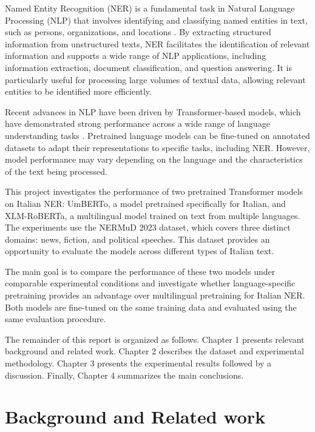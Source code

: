 
Named Entity Recognition (NER) is a fundamental task in Natural Language Processing (NLP) that involves identifying and classifying named entities in text, such as persons, organizations, and locations \cite{mohit2014ner}. By extracting structured information from unstructured texts, NER facilitates the identification of relevant information and supports a wide range of NLP applications, including information extraction, document classification, and question answering. It is particularly useful for processing large volumes of textual data, allowing relevant entities to be identified more efficiently.

Recent advances in NLP have been driven by Transformer-based models, which have demonstrated strong performance across a wide range of language understanding tasks \cite{vaswani2017attention}. Pretrained language models can be fine-tuned on annotated datasets to adapt their representations to specific tasks, including NER. However, model performance may vary depending on the language and the characteristics of the text being processed.

This project investigates the performance of two pretrained Transformer models on Italian NER: UmBERTo, a model pretrained specifically for Italian, and XLM-RoBERTa, a multilingual model trained on text from multiple languages. The experiments use the NERMuD 2023 dataset, which covers three distinct domains: news, fiction, and political speeches. This dataset provides an opportunity to evaluate the models across different types of Italian text.

The main goal is to compare the performance of these two models under comparable experimental conditions and investigate whether language-specific pretraining provides an advantage over multilingual pretraining for Italian NER. Both models are fine-tuned on the same training data and evaluated using the same evaluation procedure.

The remainder of this report is organized as follows. Chapter 1 presents relevant background and related work. Chapter 2 describes the dataset and experimental methodology. Chapter 3 presents the experimental results followed by a discussion. Finally, Chapter 4 summarizes the main conclusions.

\section{Background and Related work}
\label{sec:background}

